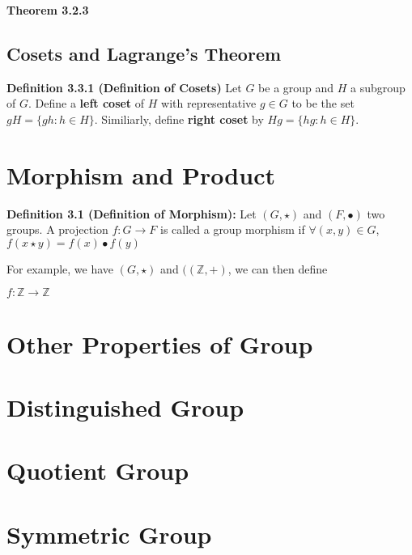 \documentclass[12pt,openany]{book}
\theoremstyle{definition}
\theoremstyle{definition}
\begin{document}
\noindent\textbf{Theorem 3.2.3}

\section{Cosets and Lagrange's Theorem}

\noindent\textbf{Definition 3.3.1 (Definition of Cosets)} Let $G$ be a group and $H$ a subgroup of $G$. Define a \textbf{left coset} of $H$ with representative $g \in G$ to be the set $gH=\{gh: h \in H\}$. Similiarly, define \textbf{right coset} by $Hg = \{hg: h\in H\}$.

\chapter{Morphism and Product}

\noindent\textbf{Definition 3.1 (Definition of Morphism):} Let $(G, \star)$ and $(F, \bullet)$ two groups. A projection $f: G \to F$ is called a group morphism if $\forall (x, y) \in G$, $f(x \star y) = f(x) \bullet f(y)$

For example, we have $(G, \star)$ and $((\mathbb{Z}, +)$, we can then define

$f: \mathbb{Z} \to \mathbb{Z}$


\chapter{Other Properties of Group}

\chapter{Distinguished Group}

\chapter{Quotient Group}

\chapter{Symmetric Group}
\end{document}

